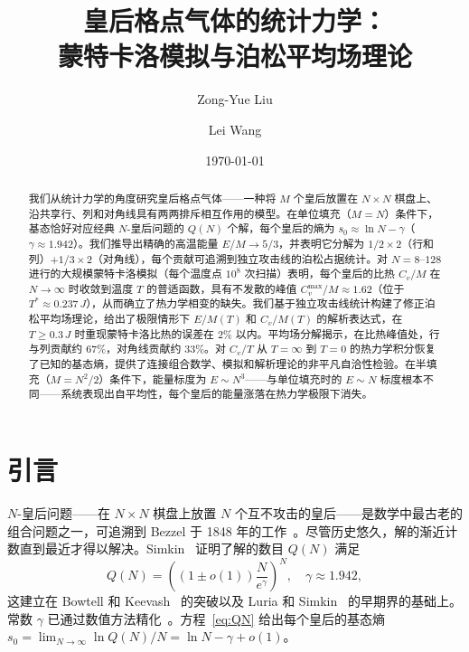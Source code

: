 \documentclass[aps, pre, reprint, amsmath, amssymb, superscriptaddress, floatfix]{revtex4-2}
\begin{document}
\title{皇后格点气体的统计力学：\\
蒙特卡洛模拟与泊松平均场理论}

\author{Zong-Yue Liu}

\author{Lei Wang}

\date{\today}

\begin{abstract}
我们从统计力学的角度研究皇后格点气体——一种将 $M$ 个皇后放置在 $N \times N$ 棋盘上、沿共享行、列和对角线具有两两排斥相互作用的模型。在单位填充（$M = N$）条件下，基态恰好对应经典 $N$-皇后问题的 $Q(N)$ 个解，每个皇后的熵为 $s_0 \approx \ln N - \gamma$（$\gamma \approx 1.942$）。我们推导出精确的高温能量 $E/M \to 5/3$，并表明它分解为 $1/2 \times 2$（行和列）$+ 1/3 \times 2$（对角线），每个贡献可追溯到独立攻击线的泊松占据统计。对 $N = 8$--$128$ 进行的大规模蒙特卡洛模拟（每个温度点 $10^8$ 次扫描）表明，每个皇后的比热 $C_v/M$ 在 $N \to \infty$ 时收敛到温度 $T$ 的普适函数，具有不发散的峰值 $C_v^{\max}/M \approx 1.62$（位于 $T^* \approx 0.237\,J$），从而确立了热力学相变的缺失。我们基于独立攻击线统计构建了修正泊松平均场理论，给出了极限情形下 $E/M(T)$ 和 $C_v/M(T)$ 的解析表达式，在 $T \ge 0.3\,J$ 时重现蒙特卡洛比热的误差在 $2\%$ 以内。平均场分解揭示，在比热峰值处，行与列贡献约 $67\%$，对角线贡献约 $33\%$。对 $C_v/T$ 从 $T = \infty$ 到 $T = 0$ 的热力学积分恢复了已知的基态熵，提供了连接组合数学、模拟和解析理论的非平凡自洽性检验。在半填充（$M = N^2/2$）条件下，能量标度为 $E \sim N^3$——与单位填充时的 $E \sim N$ 标度根本不同——系统表现出自平均性，每个皇后的能量涨落在热力学极限下消失。
\end{abstract}

\maketitle

\section{引言}
\label{sec:intro}

$N$-皇后问题——在 $N \times N$ 棋盘上放置 $N$ 个互不攻击的皇后——是数学中最古老的组合问题之一，可追溯到 Bezzel 于 1848 年的工作~\cite{Bezzel1848}。尽管历史悠久，解的渐近计数直到最近才得以解决。Simkin~\cite{Simkin2022} 证明了解的数目 $Q(N)$ 满足
\begin{equation}
  Q(N) = \left((1 \pm o(1))\frac{N}{e^{\gamma}} \right)^N, \quad
  \gamma \approx 1.942,
  \label{eq:QN}
\end{equation}
这建立在 Bowtell 和 Keevash~\cite{Bowtell2023} 的突破以及 Luria 和 Simkin~\cite{Luria2021} 的早期界的基础上。常数 $\gamma$ 已通过数值方法精化~\cite{Nobel2023}。方程~\eqref{eq:QN} 给出每个皇后的基态熵
$s_0 = \lim_{N \to \infty} \ln Q(N)/N = \ln N - \gamma + o(1)$。
\end{document}

